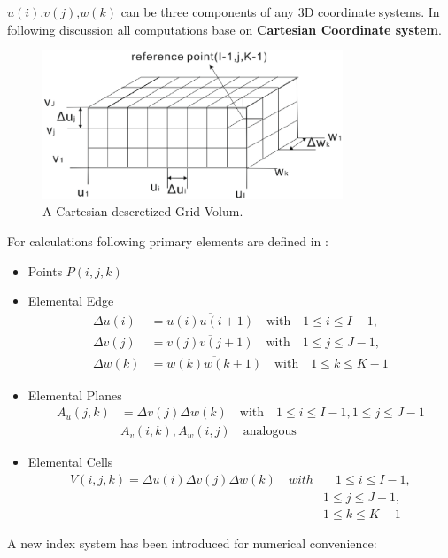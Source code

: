 $u(i)$,$v(j)$,$w(k)$ can be three components of any 3D coordinate systems. In following discussion all computations base on \textbf{Cartesian Coordinate system}.\\
\begin{figure}[!ht]
\centering
\includegraphics[width=0.8\textwidth]{bilder/grid_volum}
\caption{A Cartesian descretized Grid Volum\cite{script_FeldSim}.}
\label{fig:discretization_material}
\end{figure}
For calculations following primary elements are defined in \cite{script_FeldSim}:
\begin{itemize}
\item Points $P(i,j,k)$
\item Elemental Edge
    \begin{align*}
		\Delta u(i)&=\overline{u(i)u(i+1)}  \quad \mathrm{with}  \quad 1\leq i \leq I-1, \nonumber\\
		\Delta v(j)&=\overline{v(j)v(j+1)}  \quad \mathrm{with}  \quad 1\leq j \leq J-1, \nonumber\\
		\Delta w(k)&=\overline{w(k)w(k+1)}  \quad \mathrm{with}  \quad 1\leq k \leq K-1
		\end{align*}
\item Elemental Planes
		\begin{align*}
		A_{u}(j,k)&=\Delta v(j)\Delta w(k) \quad \mathrm{with}  \quad 1\leq i \leq I-1,1\leq j \leq J-1\nonumber\\
		&A_{v}(i,k),A_{w}(i,j)  \quad \mathrm{analogous}
		\end{align*}
\item Elemental Cells
		\begin{align*}
		V(i,j,k)=\Delta u(i)\Delta v(j)\Delta w(k)  \quad with  &\quad 1\leq i\leq I-1,\nonumber\\
		&1\leq j\leq J-1,\nonumber\\
		&1\leq k\leq K-1
		\end{align*}
\end{itemize}
A new index system has been introduced for numerical convenience:

